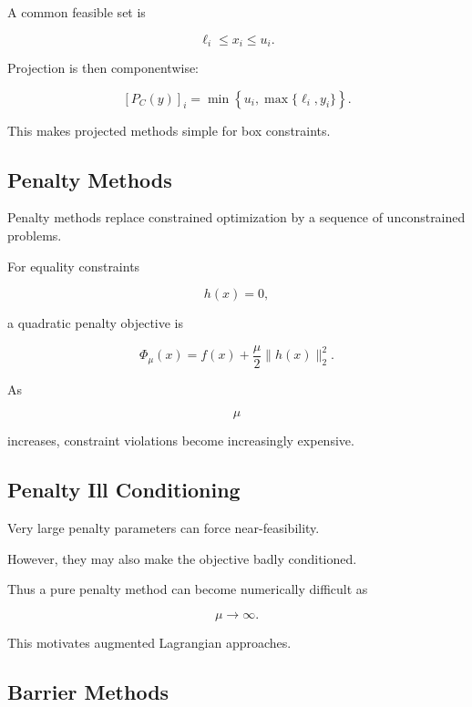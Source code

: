 A common feasible set is

\[
\boxed{
\ell_i
\leq
x_i
\leq
u_i.
}
\]

Projection is then componentwise:

\[
\boxed{
[P_C(y)]_i
=
\min
\left\{
u_i,
\max
\{
\ell_i,y_i
\}
\right\}.
}
\]

This makes projected methods simple for box constraints.

\subsection{Penalty Methods}
\label{subsec:numerical-penalty-methods}

Penalty methods replace constrained optimization by a sequence of
unconstrained problems.

For equality constraints

\[
h(x)=0,
\]

a quadratic penalty objective is

\[
\boxed{
\Phi_\mu(x)
=
f(x)
+
\frac{\mu}{2}
\|h(x)\|_2^2.
}
\]

As

\[
\mu
\]

increases, constraint violations become increasingly expensive.

\subsection{Penalty Ill Conditioning}
\label{subsec:penalty-ill-conditioning}

Very large penalty parameters can force near-feasibility.

However, they may also make the objective badly conditioned.

Thus a pure penalty method can become numerically difficult as

\[
\mu\to\infty.
\]

This motivates augmented Lagrangian approaches.

\subsection{Barrier Methods}
\label{subsec:numerical-barrier-methods}

